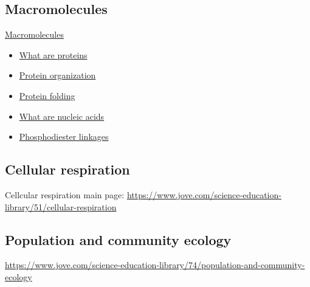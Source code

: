\documentclass[
]{book}
\providecommand{\tightlist}{%
  \setlength{\itemsep}{0pt}\setlength{\parskip}{0pt}}
\begin{document}
\hypertarget{macromolecules}{%
\subsection{Macromolecules}\label{macromolecules}}

\href{https://www.jove.com/science-education-library/45/macromolecules}{Macromolecules}

\begin{itemize}
\tightlist
\item
  \href{https://www.jove.com/science-education/10677/what-are-proteins}{What are proteins}
\item
  \href{https://www.jove.com/science-education/10678/protein-organization}{Protein organization}
\item
  \href{https://www.jove.com/science-education/10679/protein-folding}{Protein folding}
\item
  \href{https://www.jove.com/science-education/10684/what-are-nucleic-acids}{What are nucleic acids}
\item
  \href{https://www.jove.com/science-education/10685/phosphodiester-linkages}{Phosphodiester linkages}
\end{itemize}

\hypertarget{cellular-respiration}{%
\subsection{Cellular respiration}\label{cellular-respiration}}

Cellcular respiration main page: \url{https://www.jove.com/science-education-library/51/cellular-respiration}

\hypertarget{population-and-community-ecology}{%
\subsection{Population and community ecology}\label{population-and-community-ecology}}

\url{https://www.jove.com/science-education-library/74/population-and-community-ecology}
\end{document}
